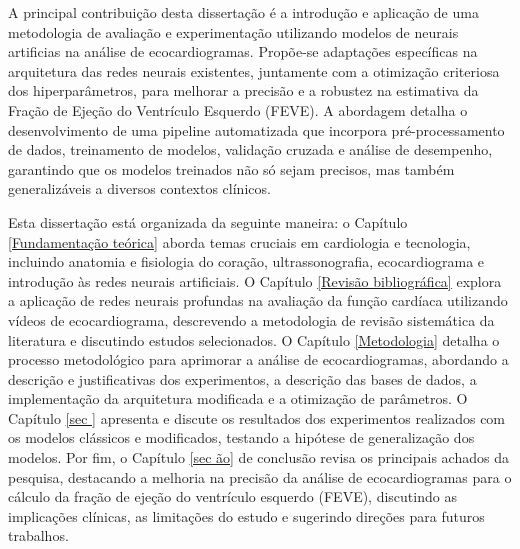 A principal contribuição desta dissertação é a introdução e aplicação de uma metodologia  de avaliação e experimentação utilizando modelos de neurais artificias na análise de ecocardiogramas. Propõe-se adaptações específicas na arquitetura das redes neurais existentes, juntamente com a otimização criteriosa dos hiperparâmetros, para melhorar a precisão e a robustez na estimativa da Fração de Ejeção do Ventrículo Esquerdo (FEVE). A abordagem detalha o desenvolvimento de uma pipeline automatizada que incorpora pré-processamento de dados, treinamento de modelos, validação cruzada e análise de desempenho, garantindo que os modelos treinados não só sejam precisos, mas também generalizáveis a diversos contextos clínicos.

Esta dissertação está organizada da seguinte maneira: o Capítulo \ref{Fundamentação teórica} aborda temas cruciais em cardiologia e tecnologia, incluindo anatomia e fisiologia do coração, ultrassonografia, ecocardiograma e introdução às redes neurais artificiais. O Capítulo \ref{Revisão bibliográfica} explora a aplicação de redes neurais profundas na avaliação da função cardíaca utilizando vídeos de ecocardiograma, descrevendo a metodologia de revisão sistemática da literatura e discutindo estudos selecionados. O Capítulo \ref{Metodologia} detalha o processo metodológico para aprimorar a análise de ecocardiogramas, abordando a descrição e justificativas dos experimentos, a descrição das bases de dados, a implementação da arquitetura modificada e a otimização de parâmetros. O Capítulo \ref{sec
} apresenta e discute os resultados dos experimentos realizados com os modelos clássicos e modificados, testando a hipótese de generalização dos modelos. Por fim, o Capítulo \ref{sec
ão} de conclusão revisa os principais achados da pesquisa, destacando a melhoria na precisão da análise de ecocardiogramas para o cálculo da fração de ejeção do ventrículo esquerdo (FEVE), discutindo as implicações clínicas, as limitações do estudo e sugerindo direções para futuros trabalhos.



